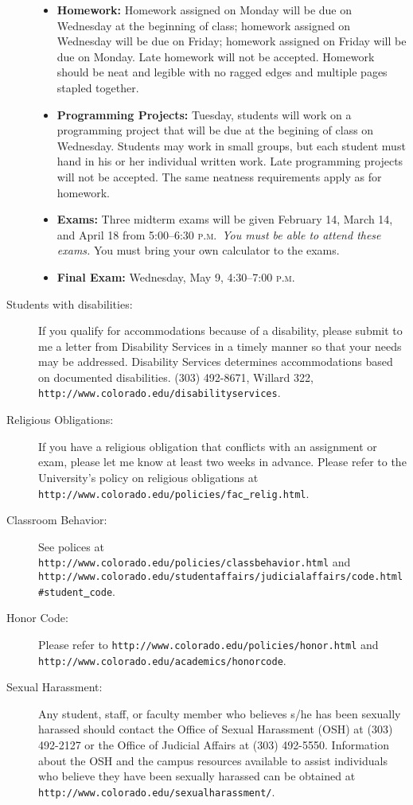 \documentclass[11pt]{article}
\newcommand{\PM}{\textsc{p.m.}}
\newcommand{\url}[1]{\texttt{#1}}
\begin{document}
\begin{description}
\begin{itemize}
	\item \textbf{Homework:} Homework assigned on Monday will be due on Wednesday at the beginning of class; homework assigned on Wednesday will be due on Friday; homework assigned on Friday will be due on Monday. Late homework will not be accepted. Homework should be neat and legible with no ragged edges and multiple pages stapled together.
	
	\item \textbf{Programming Projects:} Tuesday, students will work on a programming project that will be due at the begining of class on Wednesday. Students may work in small groups, but each student must hand in his or her individual written work. Late programming projects will not be accepted. The same neatness requirements apply as for homework.
	\item \textbf{Exams:} Three midterm exams will be given February 14, March 14, and April 18 from 5:00--6:30 \PM\ \emph{You must be able to attend these exams.} You must bring your own calculator to the exams.
	\item \textbf{Final Exam:} Wednesday, May 9, 4:30--7:00 \PM
\end{itemize}

\item[Students with disabilities: ]
If you qualify for accommodations because of a disability, please submit to me a letter from Disability Services in a timely manner so that your needs may be addressed.  Disability Services determines accommodations based on documented disabilities. (303) 492-8671, Willard 322, \url{http://www.colorado.edu/disabilityservices}.

\item[Religious Obligations: ]
If you have a religious obligation that conflicts with an assignment or exam, please let me know at least two weeks in advance. Please refer to the University's policy on religious obligations at \url{http://www.colorado.edu/policies/fac\underline{\ }relig.html}.

\item[Classroom Behavior: ]
See polices at \\
\url{http://www.colorado.edu/policies/classbehavior.html} and  \\
\url{http://www.colorado.edu/studentaffairs/judicialaffairs/code.html\#student\underline{\ }code}.

\item[Honor Code: ] Please refer to \url{http://www.colorado.edu/policies/honor.html} and \\
\url{http://www.colorado.edu/academics/honorcode}.

\item[Sexual Harassment: ]
Any student, staff, or faculty member who believes s/he has been sexually harassed should contact the Office of Sexual Harassment (OSH) at (303) 492-2127 or the Office of Judicial Affairs at (303) 492-5550. Information about the OSH and the campus resources available to assist individuals who believe they have been sexually harassed can be obtained at \url{http://www.colorado.edu/sexualharassment/}.
\end{description}
\end{document}
